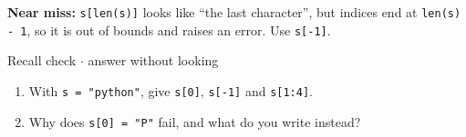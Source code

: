 \documentclass[11pt]{article}
\begin{document}
\begin{keepsection}
\begin{keepsection}
\begin{notebox}\textbf{Near miss:} \texttt{s[len(s)]} looks like “the last character”, but indices end at \texttt{len(s) - 1}, so it is out of bounds and raises an error. Use \texttt{s[-1]}.\end{notebox}

\begin{recallbox}{Recall check \ensuremath{\cdot} answer without looking}
\begin{enumerate}
\item With \texttt{s = "python"}, give \texttt{s[0]}, \texttt{s[-1]} and \texttt{s[1:4]}.
\item Why does \texttt{s[0] = "P"} fail, and what do you write instead?
\end{enumerate}

\end{recallbox}
\end{keepsection}
\end{keepsection}
\end{document}

